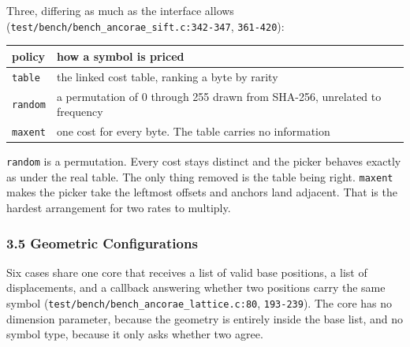 Three, differing as much as the interface allows (\texttt{test/\allowbreak{}bench/\allowbreak{}bench\_\allowbreak{}ancorae\_\allowbreak{}sift.\allowbreak{}c:342-\allowbreak{}347}, \texttt{361-\allowbreak{}420}):

\tiny
\setlength{\tabcolsep}{2pt}
\begin{longtable}{@{}>{\raggedright\arraybackslash}p{}>{\raggedright\arraybackslash}p{}@{}}
\toprule
policy & how a symbol is priced \\
\midrule
\texttt{table} & the linked cost table, ranking a byte by rarity \\
\texttt{random} & a permutation of 0 through 255 drawn from SHA-256, unrelated to frequency \\
\texttt{maxent} & one cost for every byte. The table carries no information \\
\bottomrule
\end{longtable}
\normalsize

\texttt{random} is a permutation. Every cost stays distinct and the picker behaves exactly as under the real table. The only thing removed is the table being right. \texttt{maxent} makes the picker take the leftmost offsets and anchors land adjacent. That is the hardest arrangement for two rates to multiply.

\subsubsection{3.5 Geometric Configurations}

Six cases share one core that receives a list of valid base positions, a list of displacements, and a callback answering whether two positions carry the same symbol (\texttt{test/\allowbreak{}bench/\allowbreak{}bench\_\allowbreak{}ancorae\_\allowbreak{}lattice.\allowbreak{}c:80}, \texttt{193-\allowbreak{}239}). The core has no dimension parameter, because the geometry is entirely inside the base list, and no symbol type, because it only asks whether two agree.

